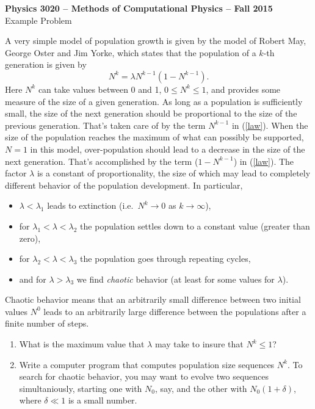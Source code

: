 \documentclass[14pt]{article}
\begin{document}
{\begin{center}
{\bf\large  Physics 3020 -- Methods of Computational Physics -- 
Fall 2015}\\[2mm]
Example Problem \\[2mm]
\end{center}

A very simple model of population growth is given by the model of
Robert May, George Oster and Jim Yorke, which states that the
population of a $k$-th generation is given by
\begin{equation} \label{law}
N^k = \lambda N^{k-1} ( 1 - N^{k-1}).
\end{equation}
Here $N^k$ can take values between 0 and 1, $0 \leq N^k \leq 1$, and
provides some measure of the size of a given generation.  As long as a
population is sufficiently small, the size of the next generation
should be proportional to the size of the previous generation.  That's
taken care of by the term $N^{k-1}$ in (\ref{law}).  When the size of
the population reaches the maximum of what can possibly be supported,
$N=1$ in this model, over-population should lead to a decrease in the
size of the next generation.  That's accomplished by the term ($1 -
N^{k-1}$) in (\ref{law}).  The factor $\lambda$ is a constant of
proportionality, the size of which may lead to completely different
behavior of the population development.  In particular,
\begin{itemize}
\item  $\lambda <\lambda_1$ leads to extinction (i.e.~$N^k \rightarrow 0$ as
$k \rightarrow \infty$),
\item for $\lambda_1 < \lambda < \lambda_2$ 
the population settles down to a constant value (greater than
zero),
\item for $\lambda_2 < \lambda < \lambda_3$ the population goes
through repeating cycles, 
\item and for $\lambda > \lambda_3$ we find {\em
chaotic} behavior (at least for some values for $\lambda$).  
\end{itemize}
Chaotic behavior means that an arbitrarily small
difference between two initial values $N^0$ leads to an arbitrarily
large difference between the populations after a finite number of
steps. 

\begin{enumerate}
\item
What is the maximum value that $\lambda$ may take to insure 
that $N^k \leq 1$?

\item
Write a computer program that
computes population size sequences $N^k$.  To search for chaotic
behavior, you may want to evolve two sequences simultaniously,
starting one with $N_0$, say, and the other with $N_0(1 + \delta)$,
where $\delta \ll 1$ is a small number.


\end{enumerate}}
\end{document}
